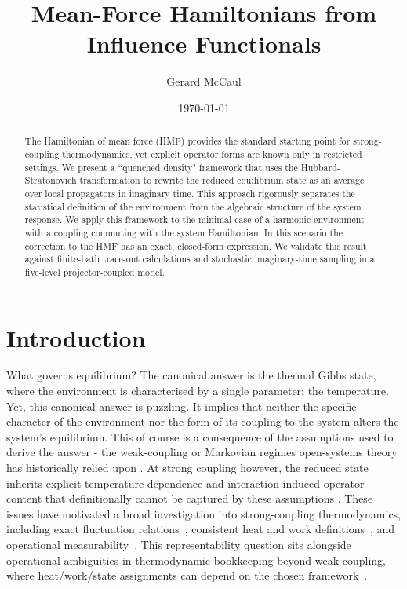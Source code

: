 ﻿\documentclass[aps,prl,twocolumn,superscriptaddress,showpacs,floatfix]{revtex4-2}
\begin{document}
\title{Mean-Force Hamiltonians from Influence Functionals}
\author{Gerard McCaul}
\date{\today}

\begin{abstract}
The Hamiltonian of mean force (HMF) provides the standard starting point for strong-coupling thermodynamics, yet explicit operator forms are known only in restricted settings. We present a ``quenched density" framework that uses the Hubbard-Stratonovich transformation to rewrite the reduced equilibrium state as an average over local propagators in imaginary time. This approach rigorously separates the statistical definition of the environment from the algebraic structure of the system response. We apply this framework to the minimal case of a harmonic environment with a coupling commuting with the system Hamiltonian. In this scenario the correction to the HMF has an exact, closed-form expression. We validate this result against finite-bath trace-out calculations and stochastic imaginary-time sampling in a five-level projector-coupled model.
\end{abstract}

\maketitle

\section{\label{sec:intro}Introduction}

What governs equilibrium? The canonical answer is the thermal Gibbs state, where the environment is characterised by a single parameter: the temperature. Yet, this canonical answer is puzzling. It implies that neither the specific character of the environment nor the form of its coupling to the system alters the system's equilibrium. This of course is a consequence of the assumptions used to derive the answer - the weak-coupling or Markovian regimes open-systems theory has historically relied upon \cite{breuerTheoryOpenQuantum2002}. At strong coupling however, the reduced state inherits explicit temperature dependence and interaction-induced operator content that definitionally cannot be captured by these assumptions \cite{hanggiFiniteQuantumDissipation2008,ingoldSpecificHeatAnomalies2009}. These issues have motivated a broad investigation into strong-coupling thermodynamics, including exact fluctuation relations~\cite{campisiFluctuationTheoremArbitrary2009,jarzynskiNonequilibriumWorkTheorem2004,gooldNonequilibriumThermodynamics2019}, consistent heat and work definitions~\cite{espositoNatureHeatStrongly2015,rivasStrongCouplingThermodynamics2020,lacerdaQuantumThermodynamicsFast2023}, and operational measurability~\cite{strasbergMeasurabilityNonequilibriumThermodynamics2020,millerEntropyProduction2017,binderOperationalThermodynamics2019}. This representability question sits alongside operational ambiguities in thermodynamic bookkeeping beyond weak coupling, where heat/work/state assignments can depend on the chosen framework~\cite{BinderVinjanampathyModiGoold2015}. 
\end{document}
